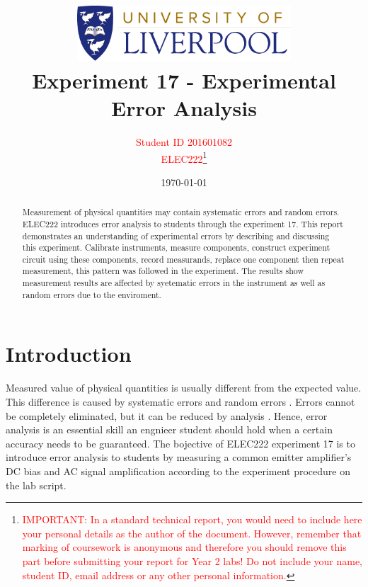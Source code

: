 \documentclass[11pt, a4paper]{article}
\title{
  \includegraphics[width=0.6\textwidth]{LivUniCrest} \\
  Experiment 17 - Experimental Error Analysis
}
\author{
  \textcolor{red}{Student ID 201601082} \\     %
  \textcolor{red}{ELEC222}\footnote{\textcolor{red}{IMPORTANT: In a standard technical report, you would need to include here your personal details as the author of the document. However, remember that marking of coursework is anonymous and therefore you should remove this part before submitting your report for Year 2 labs! Do not include your name, student ID, email address or any other personal information.}}
}
\date{\today}
\begin{document}
\begin{titlepage}
  \maketitle

  \begin{abstract}
Measurement of physical quantities may contain systematic errors and random errors. ELEC222 introduces error analysis to students through the experiment 17. This report demonstrates an understanding of experimental errors by describing and discussing this experiment. Calibrate instruments, measure components, construct experiment circuit using these components, record measurands, replace one component then repeat measurement, this pattern was followed in the experiment. The results show measurement results are affected by syetematic errors in the instrument as well as random errors due to the enviroment.
  \end{abstract}


\tableofcontents
\end{titlepage}


\section{Introduction}

Measured value of physical quantities is usually different from the expected value. This difference is caused by systematic errors and random errors \cite{lab_script}. Errors cannot be completely eliminated, but it can be reduced by analysis \cite{lab_script}. Hence, error analysis is an essential skill an engnieer student should hold when a certain accuracy needs to be guaranteed. The bojective of ELEC222 experiment 17 is to introduce error analysis to students by measuring a common emitter amplifier's DC bias and AC signal amplification according to the experiment procedure on the lab script.
\end{document}
